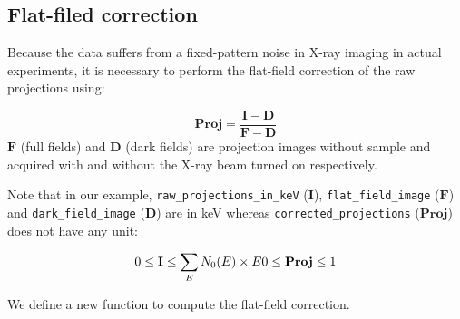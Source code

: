 \documentclass[11pt]{article}
\begin{document}
    \hypertarget{flat-filed-correction}{%
\subsection{Flat-filed correction}\label{flat-filed-correction}}

Because the data suffers from a fixed-pattern noise in X-ray imaging in
actual experiments, it is necessary to perform the flat-field correction
of the raw projections using:

\[\mathbf{Proj} = \frac{\mathbf{I} - \mathbf{D}}{\mathbf{F} - \mathbf{D}}\]
\(\mathbf{F}\) (full fields) and \(\mathbf{D}\) (dark fields) are
projection images without sample and acquired with and without the X-ray
beam turned on respectively.

Note that in our example, \texttt{raw\_projections\_in\_keV}
(\(\mathbf{I}\)), \texttt{flat\_field\_image} (\(\mathbf{F}\)) and
\texttt{dark\_field\_image} (\(\mathbf{D}\)) are in keV whereas
\texttt{corrected\_projections} (\(\mathbf{Proj}\)) does not have any
unit:

\[0 \leq \mathbf{I} \leq  \sum_E N_0(E) \times E\\0 \leq \mathbf{Proj} \leq 1\]

We define a new function to compute the flat-field correction.
\end{document}
